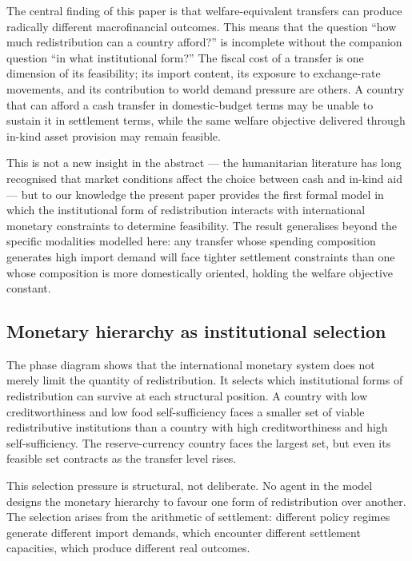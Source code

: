 \documentclass[preprint,review,12pt]{elsarticle}
\begin{document}
The central finding of this paper is that welfare-equivalent transfers
can produce radically different macrofinancial outcomes. This means that
the question ``how much redistribution can a country afford?'' is
incomplete without the companion question ``in what institutional
form?'' The fiscal cost of a transfer is one dimension of its
feasibility; its import content, its exposure to exchange-rate
movements, and its contribution to world demand pressure are others. A
country that can afford a cash transfer in domestic-budget terms may be
unable to sustain it in settlement terms, while the same welfare
objective delivered through in-kind asset provision may remain feasible.

This is not a new insight in the abstract --- the humanitarian
literature has long recognised that market conditions affect the choice
between cash and in-kind aid --- but to our knowledge the present paper
provides the first formal model in which the institutional form of
redistribution interacts with international monetary constraints to
determine feasibility. The result generalises beyond the specific
modalities modelled here: any transfer whose spending composition
generates high import demand will face tighter settlement constraints
than one whose composition is more domestically oriented, holding the
welfare objective constant.

\subsection{Monetary hierarchy as institutional selection}

The phase diagram shows that the international monetary system does not
merely limit the quantity of redistribution. It selects which
institutional forms of redistribution can survive at each structural
position. A country with low creditworthiness and low food
self-sufficiency faces a smaller set of viable redistributive
institutions than a country with high creditworthiness and high
self-sufficiency. The reserve-currency country faces the largest set,
but even its feasible set contracts as the transfer level rises.

This selection pressure is structural, not deliberate. No agent in the
model designs the monetary hierarchy to favour one form of
redistribution over another. The selection arises from the arithmetic of
settlement: different policy regimes generate different import demands,
which encounter different settlement capacities, which produce different
real outcomes.
\end{document}

